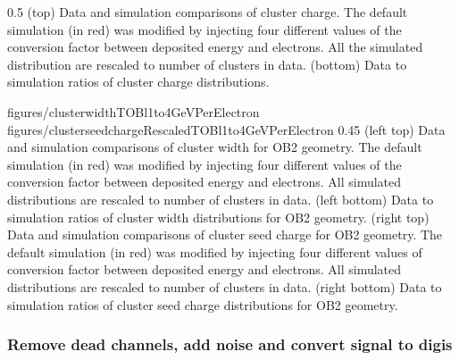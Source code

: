                  {0.5}       %
                 { (top) Data and simulation comparisons of cluster charge. The default simulation (in red) was modified by injecting four different values of the conversion factor between deposited energy and electrons. All the simulated distribution are rescaled to number of clusters in data. (bottom) Data to simulation ratios of cluster charge distributions. }

                 {figures/clusterwidthTOBl1to4GeVPerElectron}
                 {figures/clusterseedchargeRescaledTOBl1to4GeVPerElectron} %
                 {0.45}       %
                 {(left top) Data and simulation  comparisons of cluster width for OB2 geometry. The default simulation (in red) was modified by injecting four different values of the conversion factor between deposited energy and electrons. All simulated distributions are rescaled to number of clusters in data. (left bottom) Data to simulation ratios of cluster width distributions for OB2 geometry. (right top) Data and simulation  comparisons of cluster seed charge for OB2 geometry. The default simulation (in red) was modified by injecting four different values of conversion factor between deposited energy and electrons. All simulated distributions are rescaled to number of clusters in data. (right bottom) Data to simulation ratios of cluster seed charge distributions for OB2 geometry. }


\subsubsection{Remove dead channels, add noise and convert signal to digis}

